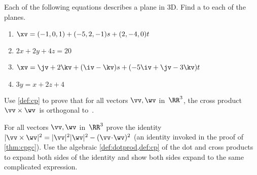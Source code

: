 \begin{exercise}  
Each of the following equations describes a plane in 3D.
Find a  to each of the planes.
\begin{enumerate}
\item \(\xv=(-1,0,1)+(-5,2,-1)s+(2,-4,0)t\)

\item \(2x+2y+4z=20\)


\item \(\xv=\jv+2\kv+(\iv-\kv)s+(-5\iv+\jv-3\kv)t\)
\answer{\(\propto\iv+8\jv+\kv\)}

\item \(3y=x+2z+4\)
\answer{\(\propto -\iv+3\jv-2\kv\)}


\end{enumerate}
\end{exercise}







\begin{exercise} \label{ex:cpga} 
Use \cref{def:cp} to prove that for all vectors \(\vv,\wv\) in~\(\RR^3\), the cross product~\(\vv\times\wv\)~is orthogonal to~\wv.
\end{exercise}




\begin{exercise} \label{ex:cpgc} 
For all vectors \(\vv,\wv\) in~\(\RR^3\) prove the identity \(|\vv\times\wv|^2=|\vv|^2|\wv|^2-(\vv\cdot\wv)^2\) (an identity invoked in the proof of \cref{thm:cpgc}). 
Use the algebraic \cref{def:dotprod,def:cp} of the dot and cross products to expand both sides of the identity and show both sides expand to the same complicated expression.
\end{exercise}




